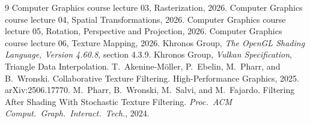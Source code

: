 \documentclass[a4paper,11pt]{article}
\begin{document}
\begin{thebibliography}{9}
 Computer Graphics course lecture 03, Rasterization, 2026.
 Computer Graphics course lecture 04, Spatial Transformations, 2026.
 Computer Graphics course lecture 05, Rotation, Perspective and Projection, 2026.
 Computer Graphics course lecture 06, Texture Mapping, 2026.
 Khronos Group, \emph{The OpenGL Shading Language, Version 4.60.8}, section 4.3.9.
 Khronos Group, \emph{Vulkan Specification}, Triangle Data Interpolation.
 T.\ Akenine-M\"oller, P.\ Ebelin, M.\ Pharr, and B.\ Wronski. Collaborative Texture Filtering. High-Performance Graphics, 2025. arXiv:2506.17770.
 M.\ Pharr, B.\ Wronski, M.\ Salvi, and M.\ Fajardo. Filtering After Shading With Stochastic Texture Filtering. \emph{Proc.\ ACM Comput.\ Graph.\ Interact.\ Tech.}, 2024.
\end{thebibliography}
\end{document}
